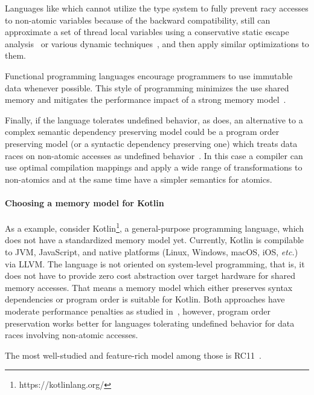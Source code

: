 Languages like \Java which cannot utilize the type system 
to fully prevent racy accesses to non-atomic variables 
because of the backward compatibility, still can 
approximate a set of thread local variables    
using a conservative static escape analysis~\cite{Choi-al:OOPSLA1999}
or various dynamic techniques~\cite{Liu-al:PLDI19},
and then apply similar optimizations to them. 

Functional programming languages encourage 
programmers to use immutable data whenever possible.
This style of programming minimizes the use 
shared memory and mitigates the performance impact 
of a strong memory model~\cite{Vollmer-al:PPoPP17}. 

Finally, if the language tolerates undefined behavior, as \CPP does, 
an alternative to a complex semantic dependency preserving model
could be a program order preserving model (or a syntactic dependency preserving one) 
which treats data races on non-atomic accesses as 
undefined behavior~\cite{Boehm-Demsky:MSPC14, Ou-Demsky:OOPSLA18}.
In this case a compiler can use optimal compilation mappings 
and apply a wide range of transformations to non-atomics 
and at the same time have a simpler semantics for atomics.

\paragraph{Choosing a memory model for Kotlin}
As a example, %
consider Kotlin\footnote{https://kotlinlang.org/},
a general-purpose programming language,
which does not have a standardized memory model yet.
Currently, Kotlin is compilable to JVM, JavaScript, and native platforms
(Linux, Windows, macOS, iOS, \emph{etc.}) via LLVM.
The language is not oriented on system-level programming,
that is, it does not have to provide zero cost abstraction over target hardware
for shared memory accesses.
That means a memory model which either preserves syntax dependencies or program order is
suitable for Kotlin.
Both approaches have moderate performance penalties as studied in~\cite{Ou-Demsky:OOPSLA18},
however, program order preservation works better for languages tolerating undefined behavior
for data races involving non-atomic accesses.


The most well-studied and feature-rich model among those is RC11~\cite{Lahav-al:PLDI17}.

